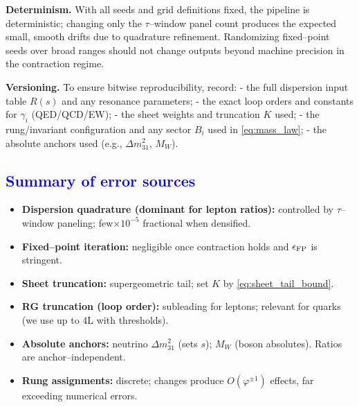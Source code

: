 \documentclass[%
 amsmath,amssymb,
 aps,
prb,
floatfix, showkeys
]{revtex4-2}
\newcommand{\modif}[1]{\textcolor{blue}{#1}}
\begin{document}
\textbf{Determinism.} With all seeds and grid definitions fixed, the pipeline is deterministic; changing only the $\tau$--window panel count produces the expected small, smooth drifts due to quadrature refinement. Randomizing fixed--point seeds over broad ranges should not change outputs beyond machine precision in the contraction regime.

\textbf{Versioning.} To ensure bitwise reproducibility, record:
- the full dispersion input table $R(s)$ and any resonance parameters;
- the exact loop orders and constants for $\gamma_i$ (QED/QCD/EW);
- the sheet weights and truncation $K$ used;
- the rung/invariant configuration and any sector $B_i$ used in \eqref{eq:mass_law};
- the absolute anchors used (e.g., $\Delta m^2_{31}$, $M_W$).







{\modif{
\subsection{Summary of error sources}
}}
\begin{itemize}
  \item \textbf{Dispersion quadrature (dominant for lepton ratios):} controlled by $\tau$--window paneling; few$\times 10^{-5}$ fractional when densified.
  \item \textbf{Fixed--point iteration:} negligible once contraction holds and $\epsilon_{\rm FP}$ is stringent.
  \item \textbf{Sheet truncation:} supergeometric tail; set $K$ by \eqref{eq:sheet_tail_bound}.
  \item \textbf{RG truncation (loop order):} subleading for leptons; relevant for quarks (we use up to 4L with thresholds).
  \item \textbf{Absolute anchors:} neutrino $\Delta m^2_{31}$ (sets $s$); $M_W$ (boson absolutes). Ratios are anchor--independent.
  \item \textbf{Rung assignments:} discrete; changes produce $O(\varphi^{\pm 1})$ effects, far exceeding numerical errors.
\end{itemize}
\end{document}
